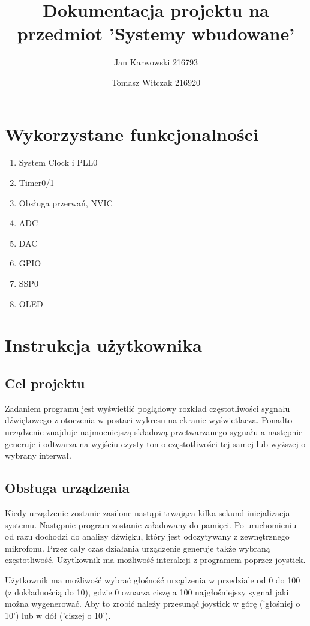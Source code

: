 \documentclass{article}
\author{
    Jan Karwowski 216793
        \and
    Tomasz Witczak 216920
}
\title{Dokumentacja projektu na przedmiot 'Systemy wbudowane'}
\begin{document}
\maketitle
\newpage

\section{Wykorzystane funkcjonalności}
\begin{enumerate}
    \item System Clock i PLL0
    \item Timer0/1
    \item Obsługa przerwań, NVIC
    \item ADC
    \item DAC
    \item GPIO
    \item SSP0
    \item OLED
\end{enumerate}

\section{Instrukcja użytkownika}

\subsection{Cel projektu}
Zadaniem programu jest wyświetlić poglądowy rozkład częstotliwości sygnału dźwiękowego z otoczenia w postaci wykresu na ekranie wyświetlacza. Ponadto urządzenie znajduje najmocniejszą składową przetwarzanego sygnału a następnie generuje i odtwarza na wyjściu czysty ton o częstotliwości tej samej lub wyższej o wybrany interwał.

\subsection{Obsługa urządzenia}
Kiedy urządzenie zostanie zasilone nastąpi trwająca kilka sekund inicjalizacja systemu. Następnie program zostanie załadowany do pamięci. Po uruchomieniu od razu dochodzi do analizy dźwięku, który jest odczytywany z zewnętrznego mikrofonu. Przez cały czas działania urządzenie generuje także wybraną częstotliwość. Użytkownik ma możliwość interakcji z programem poprzez joystick.

Użytkownik ma możliwość wybrać głośność urządzenia w przedziale od 0 do 100 (z dokładnością do 10), gdzie 0 oznacza ciszę a 100 najgłośniejszy sygnał jaki można wygenerować. Aby to zrobić należy przesunąć joystick w górę ('głośniej o 10') lub w dół ('ciszej o 10').
\end{document}
